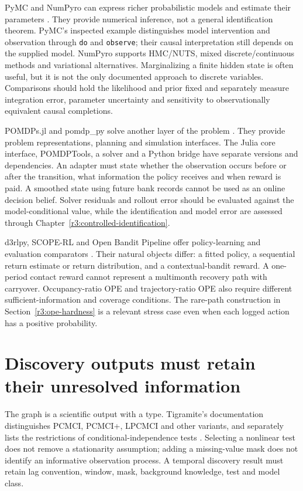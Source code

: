 PyMC and NumPyro can express richer probabilistic models and estimate their
parameters \citep{sw_pymc,sw_numpyro}. They provide numerical inference,
not a general identification theorem. PyMC's inspected example distinguishes
model intervention and observation through \texttt{do} and
\texttt{observe}; their causal interpretation still depends on the supplied
model. NumPyro supports HMC/NUTS, mixed discrete/continuous methods and
variational alternatives. Marginalizing a finite hidden state is often
useful, but it is not the only documented approach to discrete variables.
Comparisons should hold the likelihood and prior fixed and separately
measure integration error, parameter uncertainty and sensitivity to
observationally equivalent causal completions.

POMDPs.jl and pomdp\_py solve another layer of the problem
\citep{sw_pomdps,sw_pomdp_py}. They provide problem representations,
planning and simulation interfaces. The Julia core interface, POMDPTools,
a solver and a Python bridge have separate versions and dependencies.
An adapter must state whether the observation occurs before or after the
transition, what information the policy receives and when reward is paid.
A smoothed state using future bank records cannot be used as an online
decision belief. Solver residuals and rollout error should be evaluated
against the model-conditional value, while the identification and model
error are assessed through Chapter~\ref{r3:controlled-identification}.

d3rlpy, SCOPE-RL and Open Bandit Pipeline offer policy-learning and
evaluation comparators \citep{sw_d3rlpy,sw_scope_rl,sw_obp}. Their natural
objects differ: a fitted policy, a sequential return estimate or return
distribution, and a contextual-bandit reward. A one-period contact reward
cannot represent a multimonth recovery path with carryover. Occupancy-ratio
OPE and trajectory-ratio OPE also require different sufficient-information
and coverage conditions. The rare-path construction in
Section~\ref{r3:ope-hardness} is a relevant stress case even when each
logged action has a positive probability.

\section{Discovery outputs must retain their unresolved information}
\label{r3:software-discovery}

The graph is a scientific output with a type. Tigramite's documentation
distinguishes PCMCI, PCMCI+, LPCMCI and other variants, and separately lists
the restrictions of conditional-independence tests \citep{sw_tigramite}.
Selecting a nonlinear test does not remove a stationarity assumption;
adding a missing-value mask does not identify an informative observation
process. A temporal discovery result must retain lag convention, window,
mask, background knowledge, test and model class.

